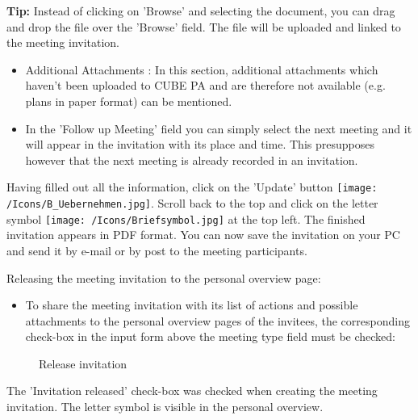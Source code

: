 \textbf{Tip:} Instead of clicking on 'Browse' and selecting the document, you can drag and drop the file over the 'Browse' field. The file will be uploaded and linked to the meeting invitation.

\vspace{\baselineskip}

\begin{itemize}
\item 
Additional Attachments : In this section, additional attachments which haven't been uploaded to CUBE PA and are therefore not available (e.g. plans in paper format) can be mentioned.
\item 
In the 'Follow up Meeting' field you can simply select the next meeting and it will appear in the invitation with its place and time. This presupposes however that the next meeting is already recorded in an invitation.
\end{itemize}

Having filled out all the information, click on the 'Update' button \texttt{[image: /Icons/B\_Uebernehmen.jpg]}. \newline
Scroll back to the top and click on the letter symbol \texttt{[image: /Icons/Briefsymbol.jpg]} at the top left. The finished invitation appears in PDF format. You can now save the invitation on your PC and send it by e-mail or by post to the meeting participants.

\vspace{\baselineskip}

Releasing the meeting invitation to the personal overview page:

\begin{itemize}
\item
To share the meeting invitation with its list of actions and possible attachments to the personal overview pages of the invitees, the corresponding check-box in the input form above the meeting type field must be checked:
\end{itemize}

\begin{figure}[H]
\caption{Release invitation}
\end{figure}

\begin{small}
The 'Invitation released' check-box was checked when creating the meeting invitation. The letter symbol is visible in the personal overview.
\end{small}

